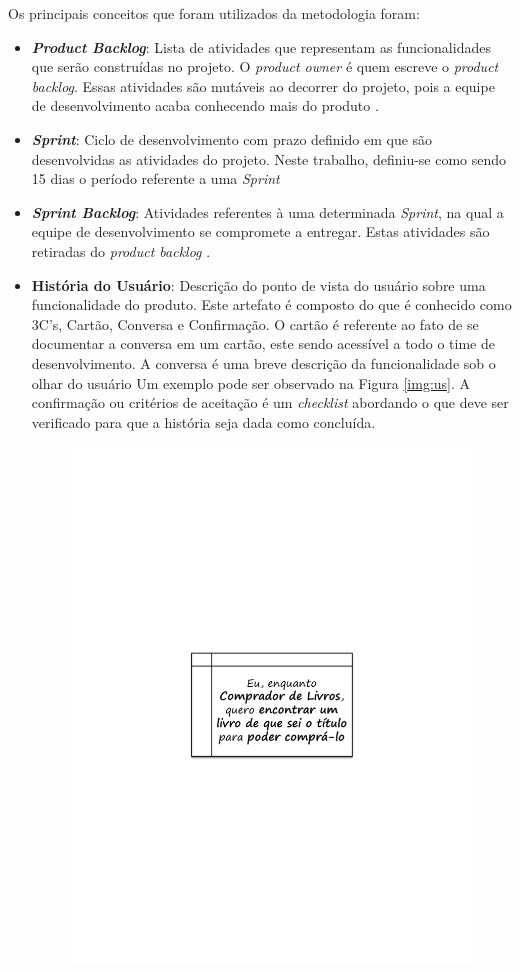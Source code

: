 Os principais conceitos que foram utilizados da metodologia foram:
\begin{itemize}
\item \textit{\textbf{Product Backlog}}: Lista de atividades que representam as funcionalidades que serão construídas no projeto. O \textit{product owner} é quem escreve o \textit{product backlog}. Essas atividades são mutáveis ao decorrer do projeto, pois a equipe de desenvolvimento acaba conhecendo mais do produto \cite{sabbagh_scrum:_2014}.
\item \textit{\textbf{Sprint}}: Ciclo de desenvolvimento com prazo definido em que são desenvolvidas as atividades do projeto. Neste trabalho, definiu-se como sendo 15 dias o período referente a uma \textit{Sprint}
\item \textit{\textbf{Sprint Backlog}}: Atividades referentes à uma determinada \textit{Sprint}, na qual a equipe de desenvolvimento se compromete a entregar. Estas atividades são retiradas do \textit{product backlog} \cite{mahnic_case_2011}.
\item \textbf{História do Usuário}: Descrição do ponto de vista do usuário sobre uma funcionalidade do produto. Este artefato é composto do que é conhecido como 3C's, Cartão, Conversa e Confirmação. O cartão é referente ao fato de se documentar a conversa em um cartão, este sendo acessível a todo o time de desenvolvimento. A conversa é uma breve descrição da funcionalidade sob o olhar do usuário Um exemplo pode ser observado na Figura \ref{img:us}. A confirmação ou critérios de aceitação é um \textit{checklist} abordando o que deve ser verificado para que a história seja dada como concluída.
\graphicspath{{figuras/}}
\begin{figure}[h!]
\centering
\includegraphics[scale=0.80]{US}

\end{figure}
\end{itemize}
